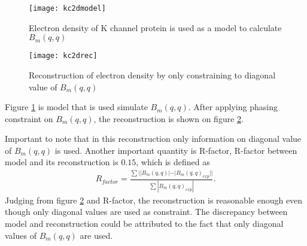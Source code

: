 \begin{figure}[ht]
  \centering
  \texttt{[image: kc2dmodel]}
\caption{ Electron density of K channel protein is used as a model to calculate $B_{m}(q,q)$}
\label{fig:kc2dmodel}
\end{figure}
\begin{figure}[ht]
  \centering
  \texttt{[image: kc2drec]}
\caption{Reconstruction of electron density by only constraining to diagonal value of $B_{m}(q,q)$}
\label{fig:kc2drec}
\end{figure}
Figure \ref{fig:kc2dmodel} is model that is used simulate $B_{m}(q,q)$. 
After applying phasing constraint on $B_{m}(q,q)$, the reconstruction is shown on figure \ref{fig:kc2drec}. 

Important to note that in this reconstruction only information on diagonal value of $B_{m}(q,q)$ is used.  
Another important quantity is R-factor, R-factor between \Bmq model and its reconstruction is $0.15$, which is defined as
\begin{eqnarray}
R_{factor}=\frac{\sum ||B_{m}(q,q)|-|B_{m}(q,q)_{exp}||}{\sum |B_{m}(q,q)_{exp}|}. 
\end{eqnarray}
Judging from figure \ref{fig:kc2drec} and R-factor, the reconstruction is reasonable enough even though only diagonal values are used as constraint. The discrepancy between model and reconstruction could be attributed to the fact that only diagonal values of $B_{m}(q,q)$ are used. 


